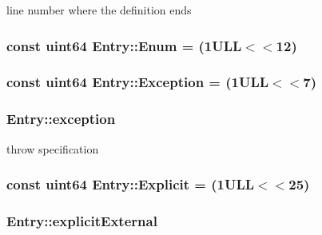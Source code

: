line number where the definition ends 

\hypertarget{class_entry_ad7939aa71a758ac6542eae7a751fa402}{}
\subsubsection[{Enum}]{\setlength{\rightskip}{0pt plus 5cm}const {\bf uint64} Entry\+::\+Enum = (1\+U\+L\+L$<$$<$12)\hspace{0.3cm}{\ttfamily [static]}}\label{class_entry_ad7939aa71a758ac6542eae7a751fa402}
\hypertarget{class_entry_af0d4d4eb70d52c24edeacf0fd339279e}{}
\subsubsection[{Exception}]{\setlength{\rightskip}{0pt plus 5cm}const {\bf uint64} Entry\+::\+Exception = (1\+U\+L\+L$<$$<$7)\hspace{0.3cm}{\ttfamily [static]}}\label{class_entry_af0d4d4eb70d52c24edeacf0fd339279e}
\hypertarget{class_entry_a81b9c13cc15e3460c8d9fdcabeb9342d}{}
\subsubsection[{exception}]{ Entry\+::exception}\label{class_entry_a81b9c13cc15e3460c8d9fdcabeb9342d}


throw specification 

\hypertarget{class_entry_aa0daa6276cfbd5511ee700e3a28fc345}{}
\subsubsection[{Explicit}]{\setlength{\rightskip}{0pt plus 5cm}const {\bf uint64} Entry\+::\+Explicit = (1\+U\+L\+L$<$$<$25)\hspace{0.3cm}{\ttfamily [static]}}\label{class_entry_aa0daa6276cfbd5511ee700e3a28fc345}
\hypertarget{class_entry_a6c5a4c9eda694f2bfd2037d7da08ba5d}{}
\subsubsection[{explicit\+External}]{ Entry\+::explicit\+External}\label{class_entry_a6c5a4c9eda694f2bfd2037d7da08ba5d}


